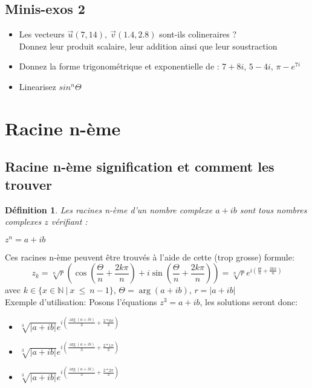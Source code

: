 \documentclass{article}
\newtheorem{defi}{Définition}
\begin{document}
\subsection{Minis-exos 2}
\begin{itemize}
  \item Les vecteurs $\overrightarrow{u}(7,14),~\overrightarrow{v}(1.4, 2.8)$ sont-ils colineraires ?\\
    Donnez leur produit scalaire, leur addition ainsi que leur soustraction
  \item Donnez la forme trigonométrique et exponentielle de : $7 + 8i$, $5 - 4i$, $\pi - e^{7i}$
  \item Linearisez $sin^{n}\Theta$
\end{itemize}

\section{Racine n-ème}

\subsection{Racine n-ème signification et comment les trouver}
\begin{defi}
  Les racines n-ème d'un nombre complexe $a + ib$ sont tous nombres complexes $z$ vérifiant :
  \begin{center}
    $z^{n} = a + ib$
  \end{center}
\end{defi}
Ces racines n-ème peuvent être trouvés à l'aide de cette (trop grosse) formule:
\[z_{k} = \sqrt[n]{r}(\cos(\frac{\Theta}{n} + \frac{2k\pi}{n}) + i\sin(\frac{\Theta}{n} + \frac{2k\pi}{n})) = \sqrt[n]{r}e^{i(\frac{\Theta}{n} + \frac{2k\pi}{n})}\] avec $k \in\{x \in\mathbb{N}~|~x~\leq~n-1\}$, $\Theta=\arg (a + ib)$, $r = |a + ib|$\\
Exemple d'utilisation:
Posons l'équations $z^{3} = a + ib$, les solutions seront donc:
\begin{itemize}
  \item $\sqrt[3]{|a + ib|}e^{i (\frac{\arg (a + ib)}{3} +\frac{2*0\pi}{3})}$
  \item $\sqrt[3]{|a + ib|}e^{i (\frac{\arg (a + ib)}{3} +\frac{2*1\pi}{3})}$
  \item $\sqrt[3]{|a + ib|}e^{i (\frac{\arg (a + ib)}{3} +\frac{2*2\pi}{3})}$
\end{itemize}
\end{document}
